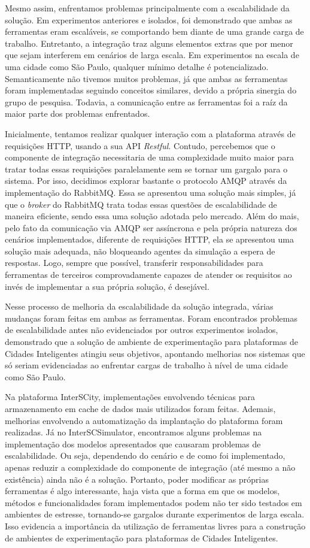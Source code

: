 Mesmo assim, enfrentamos problemas principalmente com a escalabilidade da solução.
Em experimentos anteriores e isolados, foi demonstrado que ambas as ferramentas eram escaláveis, se comportando bem diante de uma grande carga de trabalho.
Entretanto, a integração traz alguns elementos extras que por menor que sejam interferem em cenários de larga escala.
Em experimentos na escala de uma cidade como São Paulo, qualquer mínimo detalhe é potencializado.
Semanticamente não tivemos muitos problemas, já que ambas as ferramentas foram implementadas seguindo conceitos similares, devido a própria sinergia do grupo de
pesquisa.
Todavia, a comunicação entre as ferramentas foi a raíz da maior parte dos problemas enfrentados.

Inicialmente, tentamos realizar qualquer interação com a plataforma através de requisições HTTP, usando a sua API \textit{Restful}.
Contudo, percebemos que o componente de integração necessitaria de uma complexidade muito maior para tratar todas essas requisições paralelamente sem se tornar um
gargalo para o sistema.
Por isso, decidimos explorar bastante o protocolo AMQP através da implementação do RabbitMQ.
Essa se apresentou uma solução mais simples, já que o \textit{broker} do RabbitMQ trata todas essas questões de escalabilidade de maneira eficiente, sendo essa
uma solução adotada pelo mercado.
Além do mais, pelo fato da comunicação via AMQP ser assíncrona e pela própria natureza dos cenários implementados, diferente de requisições HTTP, ela se apresentou uma
solução mais adequada, não bloqueando agentes da simulação a espera de respostas.
Logo, sempre que possível, transferir responsabilidades para ferramentas de terceiros comprovadamente capazes de atender os requisitos ao invés de implementar a sua
própria solução, é desejável.

Nesse processo de melhoria da escalabilidade da solução integrada, várias mudanças foram feitas em ambas as ferramentas.
Foram encontrados problemas de escalabilidade antes não evidenciados por outros experimentos isolados, demonstrado que a solução de ambiente de experimentação para
plataformas de Cidades Inteligentes atingiu seus objetivos, apontando melhorias nos sistemas que só seriam evidenciadas ao enfrentar cargas de trabalho à nível de uma
cidade como São Paulo.

Na plataforma InterSCity, implementações envolvendo técnicas para armazenamento em cache de dados mais utilizados foram feitas.
Ademais, melhorias envolvendo a automatização da implantação do plataforma foram realizadas.
Já no InterSCSimulator, encontramos alguns problemas na implementação dos modelos apresentados que causaram problemas de escalabilidade.
Ou seja, dependendo do cenário e de como foi implementado, apenas reduzir a complexidade do componente de integração (até mesmo a não existência) ainda não é a solução.
Portanto, poder modificar as próprias ferramentas é algo interessante, haja vista que a forma em que os modelos, métodos e funcionalidades foram implementados podem não
ter sido testados em ambientes de estresse, tornando-se gargalos durante experimentos de larga escala.
Isso evidencia a importância da utilização de ferramentas livres para a construção de ambientes de experimentação para plataformas de Cidades Inteligentes.


